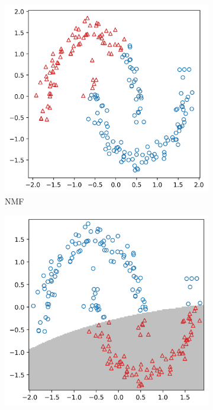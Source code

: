 \documentclass[10pt,journal,compsoc]{IEEEtran}
\begin{document}
\begin{figure}[!t]
        \begin{subfigure}{.33\textwidth}
            \centering
            \includegraphics[width=\linewidth]{figures/nmf.png}  
            \caption{NMF}
            \label{fig:nmf}
        \end{subfigure}
        \begin{subfigure}{.33\textwidth}
            \centering
            \includegraphics[width=0.98\linewidth]{figures/gmm.png}  

\end{subfigure}
\end{figure}
\end{document}
